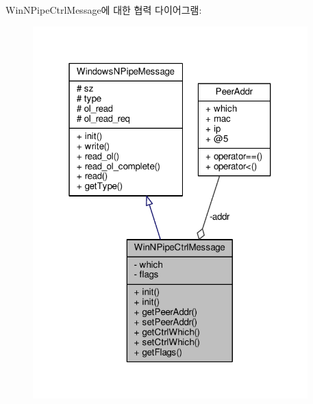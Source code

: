 Win\+N\+Pipe\+Ctrl\+Message에 대한 협력 다이어그램\+:
\nopagebreak
\begin{figure}[H]
\begin{center}
\leavevmode
\includegraphics[width=301pt]{class_win_n_pipe_ctrl_message__coll__graph}
\end{center}
\end{figure}
